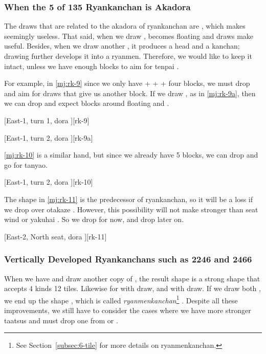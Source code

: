 \documentclass[12pt]{article}
\begin{document}
\subsubsection*{When the 5 of 135 Ryankanchan is Akadora}

The draws that are related to the akadora of  ryankanchan are , which makes  seemingly useless. That said, when we draw ,  becomes floating and  draws make  useful. Besides, when we draw another , it produces a head and a kanchan; drawing  further develops it into a ryanmen. Therefore, we would like to keep it intact, unless we have enough blocks to aim for tenpai \citep{yuusee-13r5}.

For example, in \ref{mj:rk-9} since we only have  +  +  +  four blocks, we must drop  and aim for draws that give us another block. If we draw , as in \ref{mj:rk-9a}, then we can drop  and expect blocks around floating  and .

[East-1, turn 1, dora ][rk-9]

[East-1, turn 2, dora ][rk-9a]

\ref{mj:rk-10} is a similar hand, but since we already have 5 blocks, we can drop  and go for tanyao.

[East-1, turn 2, dora ][rk-10]

The  shape in \ref{mj:rk-11} is the predecessor of  ryankanchan, so it will be a loss if we drop  over otakaze . However, this possibility will not make  stronger than seat wind or yakuhai . So we drop  for now, and drop  later on.

[East-2, North seat, dora ][rk-11]


\subsubsection*{Vertically Developed Ryankanchans such as 2246 and 2466}

When we have  and draw another copy of , the result shape  is a strong shape that accepts  4 kinds 12 tiles. Likewise for  with  draw, and  with  draw. If we draw both , we end up the shape , which is called \textit{ryanmenkanchan}\footnote{See Section~\ref{subsec:6-tile} for more details on ryanmenkanchan.} \citep{chirno-kanchan}. Despite all these improvements, we still have to consider the cases where we have more stronger taatsus and must drop one from  or .
\end{document}

